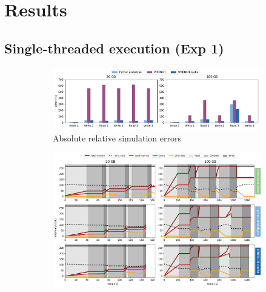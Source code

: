 \chapter{Results}
\label{results}

\section{Single-threaded execution (Exp 1)}

\begin{figure}
    \centering
    \begin{subfigure}{\linewidth}
        \centering
           \includegraphics[width=\linewidth]{result/single/figures/single_errors.pdf}
           \vspace*{-0.7cm}
           \caption{Absolute relative simulation errors}
           \vspace*{0.5cm}
           \label{fig:single_error}
        \end{subfigure}
    \begin{subfigure}{\linewidth}
        \centering
           \includegraphics[width=\linewidth]{result/single/figures/single_memprof.pdf}
           \vspace*{-0.7cm}

\end{subfigure}
\end{figure}

